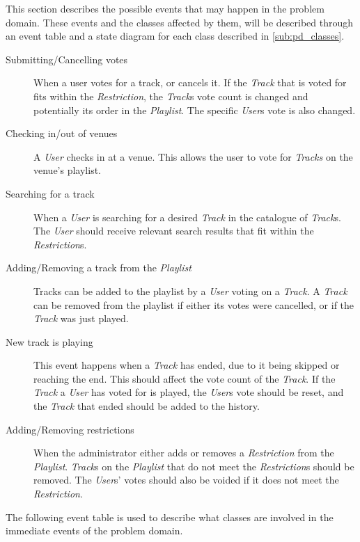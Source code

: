 This section describes the possible events that may happen in the
problem domain. These events and the classes affected by them, will be
described through an event table and a state diagram for each class
described in \cref{sub:pd_classes}.

\begin{description}

\item[Submitting/Cancelling votes]
    When a user votes for a track, or cancels it. If the \emph{Track} that is voted for fits within the \emph{Restriction}, the \emph{Track}s vote count is changed and potentially its order in the \emph{Playlist}. The specific \emph{User}s vote is also changed.

\item[Checking in/out of venues]
    A \emph{User} checks in at a venue. This allows the user to vote
    for \emph{Tracks} on the venue's playlist.

\item[Searching for a track]
    When a \emph{User} is searching for a desired \emph{Track} in the catalogue of \emph{Track}s. The \emph{User} should receive relevant search results that fit within the \emph{Restriction}s.

\item[Adding/Removing a track from the \emph{Playlist}]
    Tracks can be added to the playlist by a \emph{User} voting on a
    \emph{Track}. A \emph{Track} can be removed from the playlist if
    either its votes were cancelled, or if the \emph{Track} was just played.

\item[New track is playing]
    This event happens when a \emph{Track} has ended, due to it being skipped or
    reaching the end. This should affect the vote count of the
    \emph{Track}. If the \emph{Track} a \emph{User} has voted
    for is played, the \emph{User}s vote should be reset, and the
    \emph{Track} that ended should be added to the history.

\item[Adding/Removing restrictions]
    When the administrator either adds or removes a \emph{Restriction} from the \emph{Playlist}. \emph{Track}s on the \emph{Playlist} that do not meet the \emph{Restriction}s should be removed. The \emph{User}s' votes should also be voided if it does not meet the \emph{Restriction}.

\end{description}

The following event table is used to describe what classes are involved in the immediate events of the problem domain.

